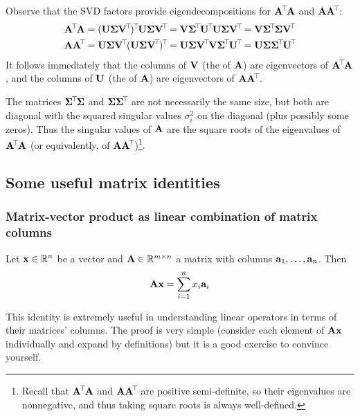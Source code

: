 Observe that the SVD factors provide eigendecompositions for $\mathbf{A}^{\!\top\!}\mathbf{A}$ and $\mathbf{A}\mathbf{A}^{\!\top\!}$:
\begin{align*}
\A\tran\A &= (\mat{U}\mat{\Sigma}\mat{V}\tran)\tran\mat{U}\mat{\Sigma}\mat{V}\tran = \mat{V}\mat{\Sigma}\tran\mat{U}\tran\mat{U}\mat{\Sigma}\mat{V}\tran = \mat{V}\mat{\Sigma}\tran\mat{\Sigma}\mat{V}\tran \\
\A\A\tran &= \mat{U}\mat{\Sigma}\mat{V}\tran(\mat{U}\mat{\Sigma}\mat{V}\tran)\tran = \mat{U}\mat{\Sigma}\mat{V}\tran\mat{V}\mat{\Sigma}\tran\mat{U}\tran = \mat{U}\mat{\Sigma}\mat{\Sigma}\tran\mat{U}\tran
\end{align*}
It follows immediately that the columns of $\mathbf{V}$ (the  of $\mathbf{A}$) are eigenvectors of $\mathbf{A}^{\!\top\!}\mathbf{A}$, and the columns of $\mathbf{U}$ (the  of $\mathbf{A}$) are eigenvectors of $\mathbf{A}\mathbf{A}^{\!\top\!}$.

The matrices $\mathbf{\Sigma}^{\!\top\!}\mathbf{\Sigma}$ and $\mathbf{\Sigma}\mathbf{\Sigma}^{\!\top\!}$ are not necessarily the same size, but both are diagonal with the squared singular values $\sigma_i^2$ on the diagonal (plus possibly some zeros).
Thus the singular values of $\mathbf{A}$ are the square roots of the eigenvalues of $\mathbf{A}^{\!\top\!}\mathbf{A}$ (or equivalently, of $\mathbf{A}\mathbf{A}^{\!\top\!}$)\footnote{
	Recall that $\mathbf{A}^{\!\top\!}\mathbf{A}$ and $\mathbf{A}\mathbf{A}^{\!\top\!}$ are positive semi-definite, so their eigenvalues are nonnegative, and thus taking square roots is always well-defined.
}.

\subsection{Some useful matrix identities}
\subsubsection{Matrix-vector product as linear combination of matrix columns}
\begin{proposition}
Let $\mathbf{x} \in \mathbb{R}^n$ be a vector and $\mathbf{A} \in \mathbb{R}^{m \times n}$ a matrix with columns $\mathbf{a}_1, \dots, \mathbf{a}_n$.
Then
\[\mathbf{A}\mathbf{x} = \sum_{i=1}^n x_i\mathbf{a}_i\]
\end{proposition}
This identity is extremely useful in understanding linear operators in terms of their matrices' columns.
The proof is very simple (consider each element of $\mathbf{A}\mathbf{x}$ individually and expand by definitions) but it is a good exercise to convince yourself.

